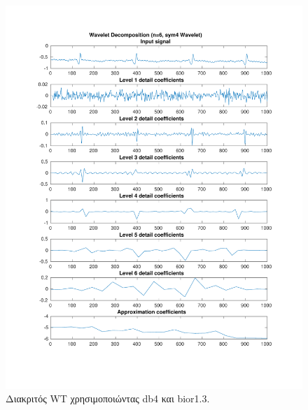 \documentclass[11pt,a4paper]{article}
\begin{document}
\begin{figure}[H]
\begin{minipage}{0.48\textwidth}
	\includegraphics[width=\textwidth]{fig/112l2_dwt2.pdf}
\end{minipage}
\vfill
\caption{Διακριτός WT χρησιμοποιώντας db4 και bior1.3.}
\label{fig:112l2_dwt}
\end{figure}
\end{document}
